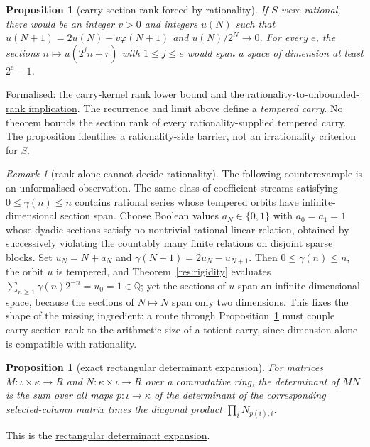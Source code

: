 \documentclass[11pt]{article}
\newcommand{\commit}{99f4bf47422abbd8757cbb22b50ba079d764d3a7}
\newcommand{\repobase}{https://github.com/wcook04/plectis-erdos/blob/\commit}
\newcommand{\PK}{Erdos249257}
\newcommand{\lword}[4]{\href{\repobase/\PK/#1\#L#2}{#4}}
\newtheorem{proposition}[theorem]{Proposition}
\theoremstyle{definition}
\theoremstyle{remark}
\newtheorem*{remark}{Remark}
\newcommand{\Q}{\mathbb{Q}}
\newcommand{\ph}{\varphi}
\begin{document}
{\begin{proposition}[carry-section rank forced by rationality]\label{res:carryrank}
If $S$ were rational, there would be an integer $v>0$ and integers $u(N)$ such
that $u(N+1)=2u(N)-v\ph(N+1)$ and $u(N)/2^N\to0$.  For every $e$, the
sections $n\mapsto u(2^jn+r)$ with
$1\leq j\leq e$ would span a space of dimension at least $2^e-1$.
\end{proposition}
\noindent Formalised:
\lword{TotientCarryKernelRigidity.lean}{211}{finrank_canonicalCarryKernel_ge_of_linearIndependent}{the carry-kernel rank lower bound}
and
\lword{TotientCarryKernelRigidity.lean}{300}{not_irrational_totientSeries_implies_unbounded_carryRank_unconditional}{the rationality-to-unbounded-rank implication}.
The recurrence and limit above define a \emph{tempered carry}.  No theorem
bounds the section rank of every rationality-supplied tempered carry.  The
proposition identifies a rationality-side barrier, not an irrationality
criterion for $S$.

\begin{remark}[rank alone cannot decide rationality]
The following counterexample is an unformalised observation.  The same class
of coefficient streams satisfying $0\leq\gamma(n)\leq n$ contains rational
series whose tempered orbits have
infinite-dimensional section span.  Choose Boolean values
\(a_N\in\{0,1\}\) with \(a_0=a_1=1\) whose dyadic sections satisfy no
nontrivial rational linear relation, obtained by successively violating the
countably many finite relations on disjoint sparse blocks.  Set
\(u_N=N+a_N\) and \(\gamma(N+1)=2u_N-u_{N+1}\).  Then
\(0\le\gamma(n)\le n\), the orbit \(u\) is tempered, and
Theorem~\ref{res:rigidity} evaluates
\(\sum_{n\ge1}\gamma(n)2^{-n}=u_0=1\in\Q\); yet the sections of \(u\) span
an infinite-dimensional space, because the sections of \(N\mapsto N\) span
only two dimensions.  This fixes the shape of the missing ingredient: a route through
Proposition~\ref{res:carryrank} must couple carry-section rank to the
arithmetic size of a totient carry, since dimension alone is compatible
with rationality.
\end{remark}

\begin{proposition}[exact rectangular determinant expansion]\label{res:signedmoment}
For matrices $M:\iota\times\kappa\to R$ and
$N:\kappa\times\iota\to R$ over a commutative ring, the determinant of
$MN$ is the sum over all maps $p:\iota\to\kappa$ of the determinant of the
corresponding selected-column matrix times the diagonal product
$\prod_i N_{p(i),i}$.
\end{proposition}
\noindent This is the
\lword{SignedQMomentObstruction.lean}{29}{det_mul_rectangular}{rectangular determinant expansion}.

}
\end{document}
